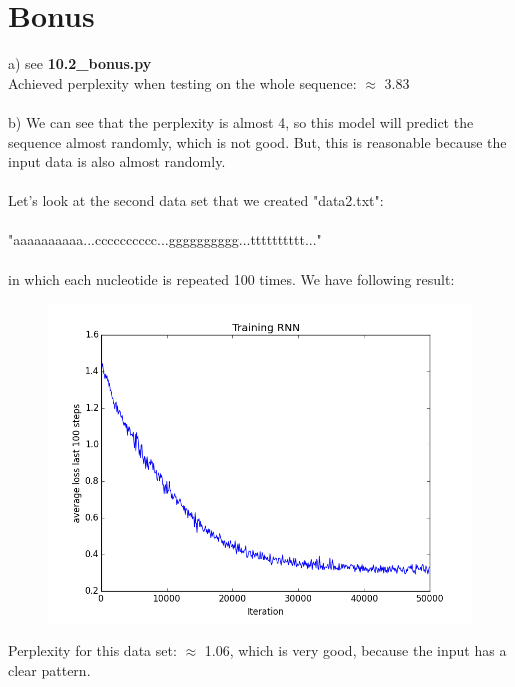 \documentclass{article}
\begin{document}
\section*{Bonus}
a) see \textbf{10.2\_bonus.py} \\

Achieved perplexity when testing on the whole sequence: $\approx$ 3.83 
\\\\
b) We can see that the perplexity is almost 4, so this model will predict the sequence almost randomly, which is not good. But, this is reasonable because the input data is also almost randomly.
\\\\
Let's look at the second data set that we created "data2.txt":\\\\
"aaaaaaaaaa...cccccccccc...gggggggggg...tttttttttt..."\\\\
in which each nucleotide is repeated 100 times. We have following result:\\

\begin{figure}[ht]
\centering
\includegraphics[scale=0.5]{bonus.png}
\end{figure}

Perplexity for this data set: $\approx$ 1.06, which is very good, because the input has a clear pattern.
\end{document}
